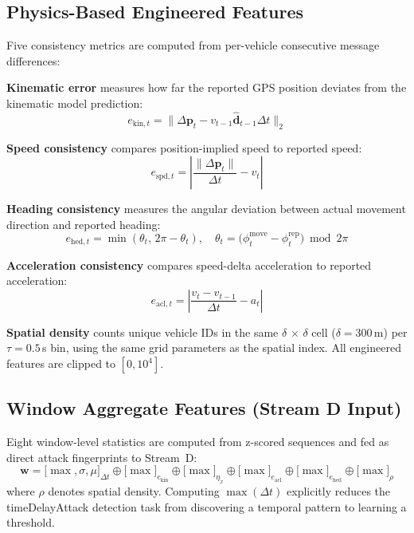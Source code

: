 \documentclass[conference]{IEEEtran}
\begin{document}
\subsection{Physics-Based Engineered Features}

Five consistency metrics are computed from per-vehicle consecutive message
differences:

\textbf{Kinematic error} measures how far the reported GPS position
deviates from the kinematic model prediction:
\begin{equation}
e_{\text{kin},t} =
  \bigl\|\Delta\mathbf{p}_t - v_{t-1}\hat{\mathbf{d}}_{t-1}\Delta t\bigr\|_2
\end{equation}

\textbf{Speed consistency} compares position-implied speed to reported
speed:
\begin{equation}
e_{\text{spd},t} = \left|\frac{\|\Delta\mathbf{p}_t\|}{\Delta t} - v_t\right|
\end{equation}

\textbf{Heading consistency} measures the angular deviation between
actual movement direction and reported heading:
\begin{equation}
e_{\text{hed},t} = \min(\theta_t,\, 2\pi - \theta_t),\quad
\theta_t = \bigl(\phi^{\text{move}}_t - \phi^{\text{rep}}_t\bigr)
           \bmod 2\pi
\end{equation}

\textbf{Acceleration consistency} compares speed-delta acceleration to
reported acceleration:
\begin{equation}
e_{\text{acl},t} = \left|\frac{v_t - v_{t-1}}{\Delta t} - a_t\right|
\end{equation}

\textbf{Spatial density} counts unique vehicle IDs in the same
$\delta\,\times\,\delta$ cell ($\delta=300$\,m) per $\tau=0.5$\,s bin,
using the same grid parameters as the spatial index.
All engineered features are clipped to $[0, 10^4]$.

\subsection{Window Aggregate Features (Stream D Input)}

Eight window-level statistics are computed from z-scored sequences and
fed as direct attack fingerprints to Stream~D:
\begin{equation}
\mathbf{w} =
\bigl[\max,\sigma,\mu\bigr]_{\Delta t} \oplus
\bigl[\max\bigr]_{e_\text{kin}} \oplus
\bigl[\max\bigr]_{\eta_x} \oplus
\bigl[\max\bigr]_{e_\text{acl}} \oplus
\bigl[\max\bigr]_{e_\text{hed}} \oplus
\bigl[\max\bigr]_{\rho}
\end{equation}
where $\rho$ denotes spatial density.  Computing $\max(\Delta t)$
explicitly reduces the timeDelayAttack detection task from discovering a
temporal pattern to learning a threshold.
\end{document}
